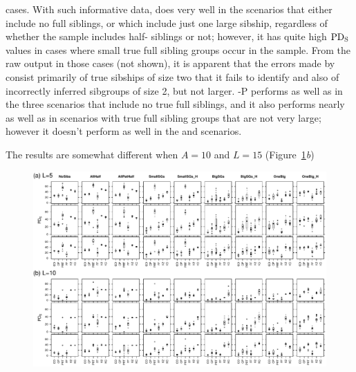 \documentclass[11pt]{article}
\begin{document}
{cases. With such informative data, \prt{} does very well in the scenarios that either include no full 
siblings, or which include just one large sibship, regardless of whether the sample includes half-
siblings or not; however, it has quite high $\PDS$ values in cases where small true full sibling groups 
occur in the sample.  From the raw output in those cases (not shown), it is apparent that the errors 
made by \prt{} consist primarily of true sibships of size two that it fails to identify and also of 
incorrectly inferred sibgroups of size 2, but not larger.  \colony{}-P performs as well as \colony{} in 
the three scenarios that include no true full siblings, and it also performs nearly as well as 
\colony{} in scenarios with true full sibling groups that are not very large; however it doesn't 
perform as well in the \onelargenoh{} and \onelargewh{} scenarios.

The results are somewhat different when $A=10$ and $L=15$ (Figure~\ref{fig:boxp2}{\em b})



\begin{figure}
\begin{center}
\includegraphics[width=\textwidth]{images/boxplots_for_paper10_num1.pdf}
\caption[Boxplot representation of values of $\PDS$ for $A=10$ alleles and $L=10$~({\em a}) and 
$L=15$~({\em b}). Format as in Figure~\protect\ref{fig:boxp1}.]{}
\label{fig:boxp2}
\end{center}
\end{figure}

}
\end{document}
